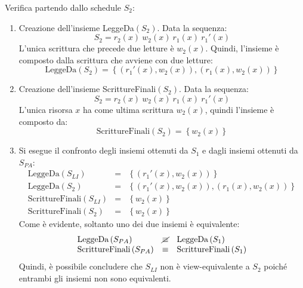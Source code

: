 \documentclass[a4paper]{article}
\begin{document}
	\noindent
	Verifica partendo dallo schedule $S_{2}$:
	\begin{enumerate}
		\item Creazione dell'insieme LeggeDa$\left(S_{2}\right)$. Data la sequenza:
		\begin{equation*}
			S_{2} = r_{2}\left(x\right) \: w_{2}\left(x\right) \: r_{1}\left(x\right) \: r_{1}'\left(x\right)
		\end{equation*}
		L'unica scrittura che precede due letture è $w_{2}\left(x\right)$. Quindi, l'insieme è composto dalla scrittura che avviene con due letture:
		\begin{equation*}
			\text{LeggeDa}\left(S_{2}\right) = \left\{\left(r_{1}'\left(x\right), w_{2}\left(x\right)\right), \left(r_{1}\left(x\right), w_{2}\left(x\right)\right)\right\}
		\end{equation*}
		
		\item Creazione dell'insieme ScrittureFinali$\left(S_{2}\right)$. Data la sequenza:
		\begin{equation*}
			S_{2} = r_{2}\left(x\right) \: w_{2}\left(x\right) \: r_{1}\left(x\right) \: r_{1}'\left(x\right)
		\end{equation*}
		L'unica risorsa $x$ ha come ultima scrittura $w_{2}\left(x\right)$, quindi l'insieme è composto da:
		\begin{equation*}
			\text{ScrittureFinali}\left(S_{2}\right) = \left\{w_{2}\left(x\right)\right\}
		\end{equation*}
		
		\item Si esegue il confronto degli insiemi ottenuti da $S_{1}$ e dagli insiemi ottenuti da $S_{PA}$:
		\begin{equation*}
			\begin{array}{lll}
				\text{LeggeDa}\left(S_{LI}\right)	&=& \left\{\left(r_{1}'\left(x\right), w_{2}\left(x\right)\right)\right\} \\
				\text{LeggeDa}\left(S_{2}\right)	&=& \left\{\left(r_{1}'\left(x\right), w_{2}\left(x\right)\right), \left(r_{1}\left(x\right), w_{2}\left(x\right)\right)\right\} \\
				\text{ScrittureFinali}\left(S_{LI}\right)	&=& \left\{w_{2}\left(x\right)\right\} \\
				\text{ScrittureFinali}\left(S_{2}\right)	&=& \left\{w_{2}\left(x\right)\right\}
			\end{array}
		\end{equation*}
		Come è evidente, soltanto uno dei due insiemi è equivalente:
		\begin{equation*}
			\begin{array}{lll}
				\text{LeggeDa}\left(S_{PA}\right)	&\cancel{\equiv}& \text{LeggeDa}\left(S_{1}\right) \\
				\text{ScrittureFinali}\left(S_{PA}\right)	&\equiv& \text{ScrittureFinali}\left(S_{1}\right)
			\end{array}
		\end{equation*}
		Quindi, è possibile concludere che $S_{LI}$ non è view-equivalente a $S_{2}$ poiché entrambi gli insiemi non sono equivalenti.
	\end{enumerate}
\end{document}
